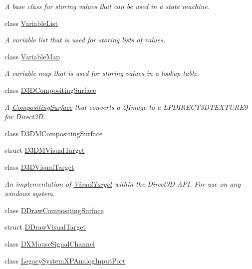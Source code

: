 \begin{DoxyCompactItemize}
\begin{DoxyCompactList}\small\item\em A base class for storing values that can be used in a state machine. \end{DoxyCompactList}\item 
class \hyperlink{class_picto_1_1_variable_list}{Variable\-List}
\begin{DoxyCompactList}\small\item\em A variable list that is used for storing lists of values. \end{DoxyCompactList}\item 
class \hyperlink{class_picto_1_1_variable_map}{Variable\-Map}
\begin{DoxyCompactList}\small\item\em A variable map that is used for storing values in a lookup table. \end{DoxyCompactList}\item 
class \hyperlink{class_picto_1_1_d3_d_compositing_surface}{D3\-D\-Compositing\-Surface}
\begin{DoxyCompactList}\small\item\em A \hyperlink{struct_picto_1_1_compositing_surface}{Compositing\-Surface} that converts a Q\-Image to a L\-P\-D\-I\-R\-E\-C\-T3\-D\-T\-E\-X\-T\-U\-R\-E9 for Direct3\-D. \end{DoxyCompactList}\item 
class \hyperlink{class_picto_1_1_d3_d_m_compositing_surface}{D3\-D\-M\-Compositing\-Surface}
\item 
struct \hyperlink{struct_picto_1_1_d3_d_m_visual_target}{D3\-D\-M\-Visual\-Target}
\item 
class \hyperlink{class_picto_1_1_d3_d_visual_target}{D3\-D\-Visual\-Target}
\begin{DoxyCompactList}\small\item\em An implementation of \hyperlink{class_picto_1_1_visual_target}{Visual\-Target} within the Direct3\-D A\-P\-I. For use on any windows system. \end{DoxyCompactList}\item 
class \hyperlink{class_picto_1_1_d_draw_compositing_surface}{D\-Draw\-Compositing\-Surface}
\item 
struct \hyperlink{struct_picto_1_1_d_draw_visual_target}{D\-Draw\-Visual\-Target}
\item 
class \hyperlink{class_picto_1_1_d_x_mouse_signal_channel}{D\-X\-Mouse\-Signal\-Channel}
\item 
class \hyperlink{class_picto_1_1_legacy_system_x_p_analog_input_port}{Legacy\-System\-X\-P\-Analog\-Input\-Port}

\end{DoxyCompactItemize}
